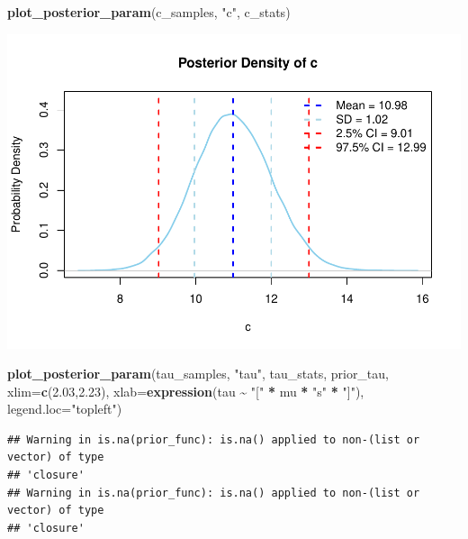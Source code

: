 \documentclass[
]{article}
\newenvironment{Shaded}{\begin{snugshade}}{\end{snugshade}}
\newcommand{\AttributeTok}[1]{\textcolor[rgb]{0.13,0.29,0.53}{#1}}
\newcommand{\FloatTok}[1]{\textcolor[rgb]{0.00,0.00,0.81}{#1}}
\newcommand{\FunctionTok}[1]{\textcolor[rgb]{0.13,0.29,0.53}{\textbf{#1}}}
\newcommand{\NormalTok}[1]{#1}
\newcommand{\SpecialCharTok}[1]{\textcolor[rgb]{0.81,0.36,0.00}{\textbf{#1}}}
\newcommand{\StringTok}[1]{\textcolor[rgb]{0.31,0.60,0.02}{#1}}
\begin{document}
\begin{Shaded}
\begin{Highlighting}[]
\FunctionTok{plot\_posterior\_param}\NormalTok{(c\_samples, }\StringTok{"c"}\NormalTok{, c\_stats)}
\end{Highlighting}
\end{Shaded}

\includegraphics{BinnedAnalysis_files/figure-latex/unnamed-chunk-6-2.pdf}

\begin{Shaded}
\begin{Highlighting}[]
\FunctionTok{plot\_posterior\_param}\NormalTok{(tau\_samples, }\StringTok{"tau"}\NormalTok{, tau\_stats, prior\_tau, }\AttributeTok{xlim=}\FunctionTok{c}\NormalTok{(}\FloatTok{2.03}\NormalTok{,}\FloatTok{2.23}\NormalTok{), }\AttributeTok{xlab=}\FunctionTok{expression}\NormalTok{(tau }\SpecialCharTok{\textasciitilde{}} \StringTok{"["} \SpecialCharTok{*}\NormalTok{ mu }\SpecialCharTok{*} \StringTok{"s"} \SpecialCharTok{*} \StringTok{"]"}\NormalTok{), }\AttributeTok{legend.loc=}\StringTok{"topleft"}\NormalTok{)}
\end{Highlighting}
\end{Shaded}

\begin{verbatim}
## Warning in is.na(prior_func): is.na() applied to non-(list or vector) of type
## 'closure'
## Warning in is.na(prior_func): is.na() applied to non-(list or vector) of type
## 'closure'
\end{verbatim}
\end{document}

